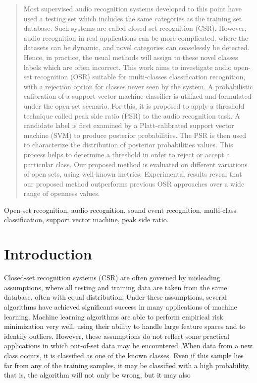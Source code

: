 \documentclass{ieeeaccess}
\begin{document}
\begin{abstract}
Most supervised audio recognition systems developed to this point have used a testing set which includes the same categories as the training set database. Such systems are called closed-set recognition (CSR). However, audio recognition in real applications can be more complicated, where the datasets can be dynamic, and novel categories can ceaselessly be detected. Hence, in practice, the usual methods will assign to these novel classes labels which are often incorrect. This work aims to investigate audio open-set recognition (OSR) suitable for multi-classes classification recognition, with a rejection option for classes never seen by the system. A probabilistic calibration of a support vector machine classifier is utilized and formulated under the open-set scenario. For this, it is proposed to apply a threshold technique called peak side ratio (PSR) to the  audio recognition task. A candidate label is first examined by a Platt-calibrated support vector machine (SVM) to produce posterior probabilities. The PSR is then used to characterize the distribution of posterior probabilities values. This process helps to determine a threshold in order to reject or accept a particular class. Our proposed method is evaluated on different variations of open sets, using well-known metrics. Experimental results reveal that our proposed method outperforms previous OSR approaches over a wide range of openness values.
\end{abstract}

\begin{keywords}
Open-set recognition, audio recognition, sound event recognition, multi-class classification, support vector machine, peak side ratio.
\end{keywords}

\titlepgskip=-15pt

\maketitle
\setcounter{page}{146523}
\section{Introduction}
\label{sec:introduction}
Closed-set recognition systems (CSR) are often governed by misleading assumptions, where all testing and training data are taken from the same database, often with equal distribution. Under these assumptions, several algorithms have achieved significant success in many applications of machine learning. Machine learning algorithms are able to perform empirical risk minimization very well, using their ability to handle large feature spaces and to identify outliers. However, these assumptions do not reflect some practical applications in which out-of-set data may be encountered. When data from a new class occurs, it is classified as one of the known classes. Even if this sample lies far from any of the training samples, it may be classified with a high probability, that is, the algorithm will not only be wrong, but it may also
\\
\end{document}
